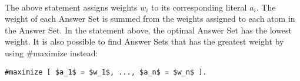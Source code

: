 \documentclass{article}
\theoremstyle{plain}
\theoremstyle{definition}
\begin{document}
\begin{multicols}{2}
\paragraph{} The above statement assigns weights $w_i$ to its corresponding literal $a_i$. The weight of each Answer Set is summed from the weights assigned to each atom in the Answer Set. In the statement above, the optimal Answer Set has the lowest weight. It is also possible to find Answer Sets that has the greatest weight by using \#maximize instead:

\begin{lstlisting}[mathescape=true]
#maximize [ $a_1$ = $w_1$, ..., $a_n$ = $w_n$ ].
\end{lstlisting}






\end{multicols}
\end{document}
